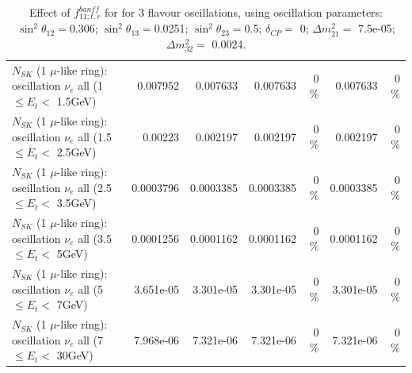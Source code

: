 \begin{table}
\begin{tabular}{| l | r | r | r  r | r  r |}
$N_{SK}$ (1 $\mu$-like ring): oscillation $\nu_{e}$ all (1 $\leq E_{t} <$ 1.5GeV) &        0.007952 &        0.007633 &        0.007633 &        0 \%  &        0.007633 &        0 \%  \\ 
$N_{SK}$ (1 $\mu$-like ring): oscillation $\nu_{e}$ all (1.5 $\leq E_{t} <$ 2.5GeV) &         0.00223 &        0.002197 &        0.002197 &        0 \%  &        0.002197 &        0 \%  \\ 
$N_{SK}$ (1 $\mu$-like ring): oscillation $\nu_{e}$ all (2.5 $\leq E_{t} <$ 3.5GeV) &       0.0003796 &       0.0003385 &       0.0003385 &        0 \%  &       0.0003385 &        0 \%  \\ 
$N_{SK}$ (1 $\mu$-like ring): oscillation $\nu_{e}$ all (3.5 $\leq E_{t} <$ 5GeV) &       0.0001256 &       0.0001162 &       0.0001162 &        0 \%  &       0.0001162 &        0 \%  \\ 
 $N_{SK}$ (1 $\mu$-like ring): oscillation $\nu_{e}$ all (5 $\leq E_{t} <$ 7GeV) &       3.651e-05 &       3.301e-05 &       3.301e-05 &        0 \%  &       3.301e-05 &        0 \%  \\ 
$N_{SK}$ (1 $\mu$-like ring): oscillation $\nu_{e}$ all (7 $\leq E_{t} <$ 30GeV) &       7.968e-06 &       7.321e-06 &       7.321e-06 &        0 \%  &       7.321e-06 &        0 \%  \\ 
\hline
\hline
\end{tabular}
\caption{ Effect of $f_{11; t, r}^{banff}$ for for 3 flavour oscillations, using oscillation parameters:  $\sin^2\theta_{12} = $0.306; $\sin^2\theta_{13} = $0.0251; $\sin^2\theta_{23} = $0.5; $\delta_{CP} = $        0; $\Delta m^2_{21} = $    7.5e-05; $\Delta m^2_{32} = $    0.0024. }
\label{tab:num_banff_11_1RmuT_3f_osc_t13:0.0251}
\end{table}
\clearpage
